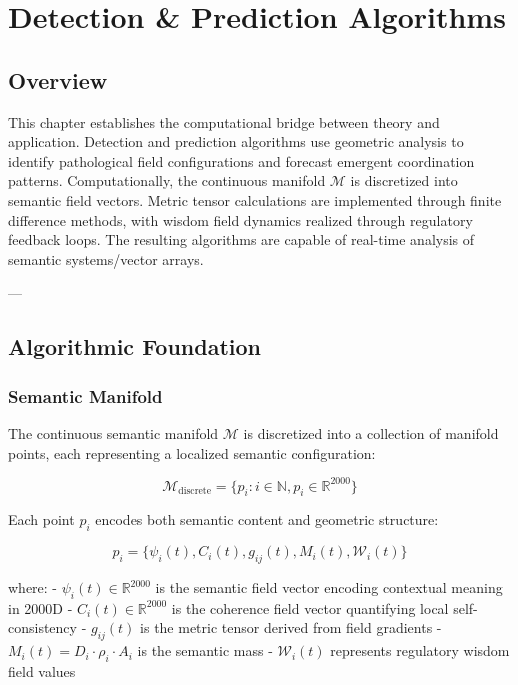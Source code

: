 \chapter{Detection \& Prediction Algorithms}

\section{Overview}

This chapter establishes the computational bridge between theory and application. Detection and prediction algorithms use geometric analysis to identify pathological field configurations and forecast emergent coordination patterns. Computationally, the continuous manifold $\mathcal{M}$ is discretized into semantic field vectors. Metric tensor calculations are implemented through finite difference methods, with wisdom field dynamics realized through regulatory feedback loops. The resulting algorithms are capable of real-time analysis of semantic systems/vector arrays.

---

\section{Algorithmic Foundation}

\subsection{Semantic Manifold}

The continuous semantic manifold $\mathcal{M}$ is discretized into a collection of manifold points, each representing a localized semantic configuration:

\begin{equation}
\mathcal{M}_{\text{discrete}} = \{p_i : i \in \mathbb{N}, p_i \in \mathbb{R}^{2000}\}
\end{equation}

Each point $p_i$ encodes both semantic content and geometric structure:

\begin{equation}
p_i = \{\psi_i(t), C_i(t), g_{ij}(t), M_i(t), \mathcal{W}_i(t)\}
\end{equation}

where:
- $\psi_i(t) \in \mathbb{R}^{2000}$ is the semantic field vector encoding contextual meaning in 2000D
- $C_i(t) \in \mathbb{R}^{2000}$ is the coherence field vector quantifying local self-consistency  
- $g_{ij}(t)$ is the metric tensor derived from field gradients
- $M_i(t) = D_i \cdot \rho_i \cdot A_i$ is the semantic mass
- $\mathcal{W}_i(t)$ represents regulatory wisdom field values

